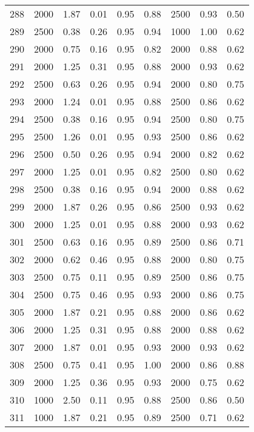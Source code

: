 \begin{longtable}[c]{ccccccccc}
288 &  2000 &  1.87 &  0.01 &  0.95 &  0.88 &  2500 &  0.93 &  0.50 \\
289 &  2500 &  0.38 &  0.26 &  0.95 &  0.94 &  1000 &  1.00 &  0.62 \\
290 &  2000 &  0.75 &  0.16 &  0.95 &  0.82 &  2000 &  0.88 &  0.62 \\
291 &  2000 &  1.25 &  0.31 &  0.95 &  0.88 &  2000 &  0.93 &  0.62 \\
292 &  2500 &  0.63 &  0.26 &  0.95 &  0.94 &  2000 &  0.80 &  0.75 \\
293 &  2000 &  1.24 &  0.01 &  0.95 &  0.88 &  2500 &  0.86 &  0.62 \\
294 &  2500 &  0.38 &  0.16 &  0.95 &  0.94 &  2500 &  0.80 &  0.75 \\
295 &  2500 &  1.26 &  0.01 &  0.95 &  0.93 &  2500 &  0.86 &  0.62 \\
296 &  2500 &  0.50 &  0.26 &  0.95 &  0.94 &  2000 &  0.82 &  0.62 \\
297 &  2000 &  1.25 &  0.01 &  0.95 &  0.82 &  2500 &  0.80 &  0.62 \\
298 &  2500 &  0.38 &  0.16 &  0.95 &  0.94 &  2000 &  0.88 &  0.62 \\
299 &  2000 &  1.87 &  0.26 &  0.95 &  0.86 &  2500 &  0.93 &  0.62 \\
300 &  2000 &  1.25 &  0.01 &  0.95 &  0.88 &  2000 &  0.93 &  0.62 \\
301 &  2500 &  0.63 &  0.16 &  0.95 &  0.89 &  2500 &  0.86 &  0.71 \\
302 &  2000 &  0.62 &  0.46 &  0.95 &  0.88 &  2000 &  0.80 &  0.75 \\
303 &  2500 &  0.75 &  0.11 &  0.95 &  0.89 &  2500 &  0.86 &  0.75 \\
304 &  2500 &  0.75 &  0.46 &  0.95 &  0.93 &  2000 &  0.86 &  0.75 \\
305 &  2000 &  1.87 &  0.21 &  0.95 &  0.88 &  2000 &  0.86 &  0.62 \\
306 &  2000 &  1.25 &  0.31 &  0.95 &  0.88 &  2000 &  0.88 &  0.62 \\
307 &  2000 &  1.87 &  0.01 &  0.95 &  0.93 &  2000 &  0.93 &  0.62 \\
308 &  2500 &  0.75 &  0.41 &  0.95 &  1.00 &  2000 &  0.86 &  0.88 \\
309 &  2000 &  1.25 &  0.36 &  0.95 &  0.93 &  2000 &  0.75 &  0.62 \\
310 &  1000 &  2.50 &  0.11 &  0.95 &  0.88 &  2500 &  0.86 &  0.50 \\
311 &  1000 &  1.87 &  0.21 &  0.95 &  0.89 &  2500 &  0.71 &  0.62 \\

\end{longtable}
